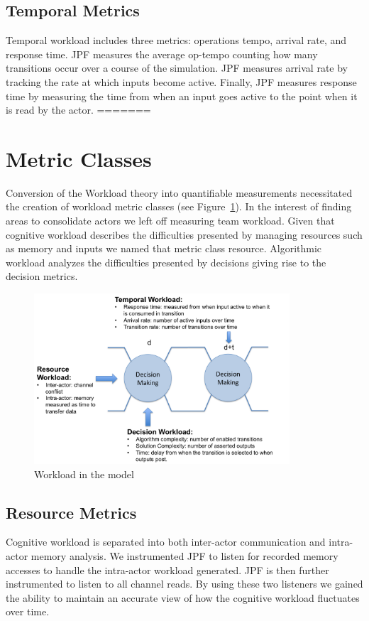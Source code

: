 \subsection{Temporal Metrics}
Temporal workload includes three metrics: operations tempo, arrival rate, and response time.  JPF measures the average op-tempo counting how many transitions occur over a course of the simulation. JPF measures arrival rate by tracking the rate at which inputs become active. Finally, JPF measures response time by measuring the time from when an input goes active to the point when it is read by the actor.
=======
\section{Metric Classes}
Conversion of the Workload theory into quantifiable measurements necessitated the creation of workload metric classes (see Figure~\ref{fig:WorkloadMetrics}). In the interest of finding areas to consolidate actors we left off measuring team workload. Given that cognitive workload describes the difficulties presented by managing resources such as memory and inputs we named that metric class resource. Algorithmic workload analyzes the difficulties presented by decisions giving rise to the decision metrics.


\begin{figure}[h]
\center
\setlength{\abovecaptionskip}{1mm}
\setlength{\belowcaptionskip}{1mm}
\setlength{\textfloatsep}{1mm}
\setlength{\floatsep}{1mm}
\includegraphics[height=2.5in]{WorkloadMetrics.png}
\caption{Workload in the model}
\label{fig:WorkloadMetrics}
\end{figure}

\subsection{Resource Metrics}
Cognitive workload is separated into both inter-actor communication and intra-actor memory analysis. We instrumented JPF to listen for recorded memory accesses to handle the intra-actor workload generated. JPF is then further instrumented to listen to all channel reads. By using these two listeners we gained the ability to maintain an accurate view of how the cognitive workload fluctuates over time.

